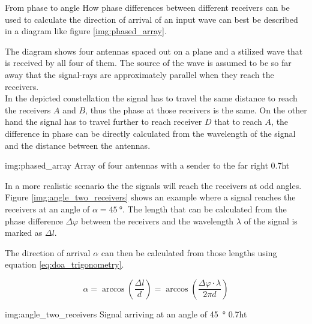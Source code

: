 \begin{subchapter}{From phase to angle}
  How phase differences between different receivers
  can be used to calculate the direction of arrival of an
  input wave can best be described in a diagram like
  figure \ref{img:phased_array}.

  The diagram shows four antennas spaced out on a plane
  and a stilized wave that is received by all four of them.
  The source of the wave is assumed to be so far away that
  the signal-rays are approximately parallel when they reach the receivers. \\

  In the depicted constellation the signal has to travel the
  same distance to reach the receivers $A$ and $B$, thus the
  phase at those receivers is the same.
  On the other hand the signal has to travel further to reach
  receiver $D$ that to reach $A$, the difference in phase can
  be directly calculated from the wavelength of the signal and
  the distance between the antennas.

               {img:phased_array}
               {Array of four antennas with a sender to the far right}
               {0.7}{ht}

  In a more realistic scenario the the signals will reach the
  receivers at odd angles. Figure \ref{img:angle_two_receivers}
  shows an example where a signal reaches the receivers at an
  angle of $\alpha=\SI{45}{\degree}$. The length that can be calculated
  from the phase difference $\Delta \varphi$ between the receivers and
  the wavelength $\lambda$ of the signal is marked as $\Delta l$.

  The direction of arrival $\alpha$ can then be calculated from
  those lengths using equation \ref{eq:doa_trigonometry}.

  \begin{equation}
    \label{eq:doa_trigonometry}
    \alpha
    = \arccos \left( \frac{\Delta l}{d} \right)
    = \arccos \left( \frac{\Delta \varphi \cdot \lambda}{2 \pi d} \right)
  \end{equation}

               {img:angle_two_receivers}
               {Signal arriving at an angle of \SI{45}{\degree}}
               {0.7}{ht}
\end{subchapter}

